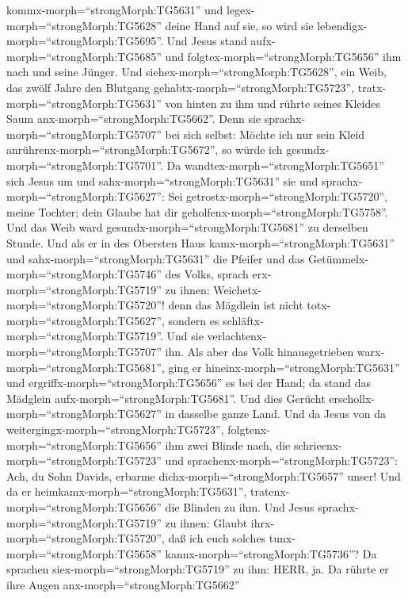 kommx-morph=``strongMorph:TG5631'' und
legex-morph=``strongMorph:TG5628'' deine Hand auf sie, so wird sie
lebendigx-morph=``strongMorph:TG5695''.  Und Jesus stand
aufx-morph=``strongMorph:TG5685'' und
folgtex-morph=``strongMorph:TG5656'' ihm nach und seine Jünger.
 Und siehex-morph=``strongMorph:TG5628'', ein Weib, das
zwölf Jahre den Blutgang gehabtx-morph=``strongMorph:TG5723'',
tratx-morph=``strongMorph:TG5631'' von hinten zu ihm und rührte seines
Kleides Saum anx-morph=``strongMorph:TG5662''.  Denn sie
sprachx-morph=``strongMorph:TG5707'' bei sich selbst: Möchte ich nur
sein Kleid anrührenx-morph=``strongMorph:TG5672'', so würde ich
gesundx-morph=``strongMorph:TG5701''.  Da
wandtex-morph=``strongMorph:TG5651'' sich Jesus um und
sahx-morph=``strongMorph:TG5631'' sie und
sprachx-morph=``strongMorph:TG5627'': Sei
getrostx-morph=``strongMorph:TG5720'', meine Tochter; dein Glaube hat
dir geholfenx-morph=``strongMorph:TG5758''. Und das Weib ward
gesundx-morph=``strongMorph:TG5681'' zu derselben Stunde. 
Und als er in des Obersten Haus kamx-morph=``strongMorph:TG5631'' und
sahx-morph=``strongMorph:TG5631'' die Pfeifer und das
Getümmelx-morph=``strongMorph:TG5746'' des Volks,  sprach
erx-morph=``strongMorph:TG5719'' zu ihnen:
Weichetx-morph=``strongMorph:TG5720''! denn das Mägdlein ist nicht
totx-morph=``strongMorph:TG5627'', sondern es
schläftx-morph=``strongMorph:TG5719''. Und sie
verlachtenx-morph=``strongMorph:TG5707'' ihn.  Als aber das
Volk hinausgetrieben warx-morph=``strongMorph:TG5681'', ging er
hineinx-morph=``strongMorph:TG5631'' und
ergriffx-morph=``strongMorph:TG5656'' es bei der Hand; da stand das
Mädglein aufx-morph=``strongMorph:TG5681''.  Und dies
Gerücht erschollx-morph=``strongMorph:TG5627'' in dasselbe ganze Land.
 Und da Jesus von da
weitergingx-morph=``strongMorph:TG5723'',
folgtenx-morph=``strongMorph:TG5656'' ihm zwei Blinde nach, die
schrieenx-morph=``strongMorph:TG5723'' und
sprachenx-morph=``strongMorph:TG5723'': Ach, du Sohn Davids, erbarme
dichx-morph=``strongMorph:TG5657'' unser!  Und da er
heimkamx-morph=``strongMorph:TG5631'',
tratenx-morph=``strongMorph:TG5656'' die Blinden zu ihm. Und Jesus
sprachx-morph=``strongMorph:TG5719'' zu ihnen: Glaubt
ihrx-morph=``strongMorph:TG5720'', daß ich euch solches
tunx-morph=``strongMorph:TG5658'' kannx-morph=``strongMorph:TG5736''? Da
sprachen siex-morph=``strongMorph:TG5719'' zu ihm: HERR, ja.
 Da rührte er ihre Augen anx-morph=``strongMorph:TG5662''
